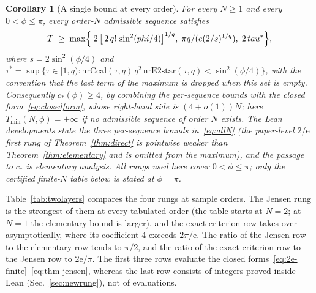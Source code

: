 \documentclass[%
  aps,
  pra,
  preprint,
  superscriptaddress,
  amsmath,amssymb,
  nofootinbib,
  floatfix,
]{revtex4-2}
\newtheorem{corollary}[theorem]{Corollary}
\theoremstyle{definition}
\theoremstyle{remark}
\newcommand{\tauvar}{\tau}
\newcommand{\cstar}{c_*}
\begin{document}
\begin{corollary}[A single bound at every order]
\label{cor:allN}
For every $N\ge1$ and every $0<\phi\le\pi$, every order-$N$ admissible sequence satisfies
\begin{equation}
T\;\ge\;\max\Bigl\{\;2\,\bigl[\,2\,q!\,\sin^2(\phi/4)\bigr]^{1/q},\;
\pi q/(\mathrm{e}(2/s)^{1/q}),\;
2\,\tauvar^\ast\Bigr\},
\label{eq:allN}
\end{equation}
where $s=2\sin^2(\phi/4)$ and
$\tauvar^\ast=\sup\{\tauvar\in[1,q):\mathrm{nrCcal}(\tauvar,q)\,q^2\,
\mathrm{nrE2star}(\tauvar,q)<\sin^2(\phi/4)\}$, with the convention that the last term of the
maximum is dropped when this set is empty.
Consequently $\cstar(\phi)\ge4$, by combining the per-sequence bounds with the closed
form~\eqref{eq:closedform}, whose right-hand side is $(4+o(1))N$; here
$T_{\min}(N,\phi)=+\infty$ if no admissible sequence of order $N$ exists. The Lean
developments state the three per-sequence bounds
in~\eqref{eq:allN} (the paper-level $2/\mathrm{e}$ first rung of Theorem~\ref{thm:direct} is
pointwise weaker than Theorem~\ref{thm:elementary} and is omitted from the maximum),
and the passage to $\cstar$ is elementary analysis. All rungs used here cover
$0<\phi\le\pi$; only the certified finite-$N$ table below is stated at $\phi=\pi$.
\end{corollary}

Table~\ref{tab:twolayers} compares the four rungs at sample orders. The Jensen rung is the
strongest of them at every tabulated order (the table starts at $N=2$; at $N=1$ the
elementary bound is larger), and the exact-criterion row takes over asymptotically, where its
coefficient $4$ exceeds $2\pi/\mathrm{e}$. The ratio of the Jensen row to the elementary row
tends to $\pi/2$, and the ratio of the exact-criterion row to the Jensen row to $2\mathrm{e}/\pi$. The first three rows evaluate the closed
forms~\eqref{eq:2e-finite}--\eqref{eq:thm-jensen}, whereas the last row consists of integers
proved inside Lean (Sec.~\ref{sec:newrung}), not of evaluations.
\end{document}
